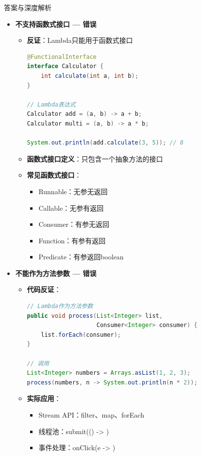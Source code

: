 \documentclass[12pt, a4paper]{ctexart}
\begin{document}
\begin{enumerate}[label=\textbf{\arabic*.}]
\begin{bluebox}{答案与深度解析}
\begin{itemize}[leftmargin=*, nosep, label={}]
			      \item[B] \textbf{不支持函数式接口 — 错误}
			            \begin{itemize}[label={}, leftmargin=*, nosep]
				            \item \textbf{反证}：Lambda只能用于函数式接口
				                  \begin{lstlisting}[language=Java]
@FunctionalInterface
interface Calculator {
    int calculate(int a, int b);
}

// Lambda表达式
Calculator add = (a, b) -> a + b;
Calculator multi = (a, b) -> a * b;

System.out.println(add.calculate(3, 5)); // 8
				      \end{lstlisting}
				            \item \textbf{函数式接口定义}：只包含一个抽象方法的接口
				            \item \textbf{常见函数式接口}：
				                  \begin{itemize}[label={}, nosep]
					                  \item Runnable：无参无返回
					                  \item Callable：无参有返回
					                  \item Consumer：有参无返回
					                  \item Function：有参有返回
					                  \item Predicate：有参返回boolean
				                  \end{itemize}
			            \end{itemize}

			      \item[C] \textbf{不能作为方法参数 — 错误}
			            \begin{itemize}[label={}, leftmargin=*, nosep]
				            \item \textbf{代码反证}：
				                  \begin{lstlisting}[language=Java]
// Lambda作为方法参数
public void process(List<Integer> list,
                    Consumer<Integer> consumer) {
    list.forEach(consumer);
}

// 调用
List<Integer> numbers = Arrays.asList(1, 2, 3);
process(numbers, n -> System.out.println(n * 2));
				      \end{lstlisting}
				            \item \textbf{实际应用}：
				                  \begin{itemize}[label={}, nosep]
					                  \item Stream API：filter、map、forEach
					                  \item 线程池：submit(() -> {})
					                  \item 事件处理：onClick(e -> {})
				                  \end{itemize}
			            \end{itemize}


\end{itemize}
\end{bluebox}
\end{enumerate}
\end{document}
